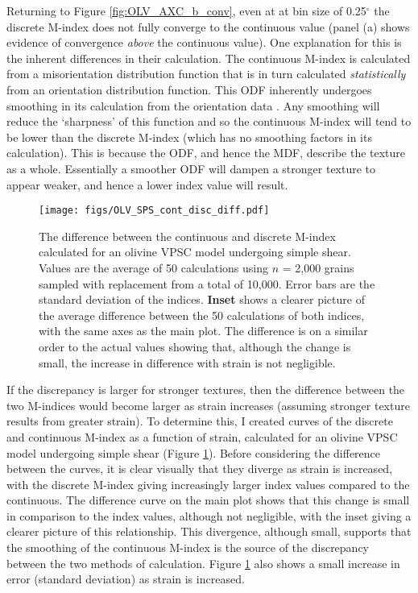 \documentclass[a4paper,12pt,twoside]{report}
\numberwithin{equation}{chapter}
\begin{document}
Returning to Figure \ref{fig:OLV_AXC_b_conv}, even at at bin size of 0.25$^\circ$ the discrete M-index does not fully converge to the continuous value (panel (a) shows evidence of convergence \emph{above} the continuous value). One explanation for this is the inherent differences in their calculation. The continuous M-index is calculated from a misorientation distribution function that is in turn calculated \emph{statistically} from an orientation distribution function. This ODF inherently undergoes smoothing in its calculation from the orientation data \citep[e.g. regularisation when inverting for the ODF in the \texttt{MTEX} algorithm, see][]{Hielscher2008}. Any smoothing will reduce the \lq{}sharpness\rq{} of this function and so the continuous M-index will tend to be lower than the discrete M-index (which has no smoothing factors in its calculation). This is because the ODF, and hence the MDF, describe the texture as a whole. Essentially a smoother ODF will dampen a stronger texture to appear weaker, and hence a lower index value will result. 

\begin{figure}[h]
  \centering
    \texttt{[image: figs/OLV\_SPS\_cont\_disc\_diff.pdf]}
  \caption[Discrete and continuous M-index difference (olivine VPSC)]{The difference between the continuous and discrete M-index calculated for an olivine VPSC model undergoing simple shear. Values are the average of 50 calculations using $n$ = 2,000 grains sampled with replacement from a total of 10,000. Error bars are the standard deviation of the indices. \textbf{Inset} shows a clearer picture of the average difference between the 50 calculations of both indices, with the same axes as the main plot. The difference is on a similar order to the actual values showing that, although the change is small, the increase in difference with strain is not negligible.}
  \label{fig:OLV_SPS_cont_disc_diff}
\end{figure}  

If the discrepancy is larger for stronger textures, then the difference between the two M-indices would become larger as strain increases (assuming stronger texture results from greater strain). To determine this, I created curves of the discrete and continuous M-index as a function of strain, calculated for an olivine VPSC model undergoing simple shear (Figure \ref{fig:OLV_SPS_cont_disc_diff}). Before considering the difference between the curves, it is clear visually that they diverge as strain is increased, with the discrete M-index giving increasingly larger index values compared to the continuous. The difference curve on the main plot shows that this change is small in comparison to the index values, although not negligible, with the inset giving a clearer picture of this relationship. This divergence, although small, supports that the smoothing of the continuous M-index is the source of the discrepancy between the two methods of calculation. Figure \ref{fig:OLV_SPS_cont_disc_diff} also shows a small increase in error (standard deviation) as strain is increased. 
\end{document}
